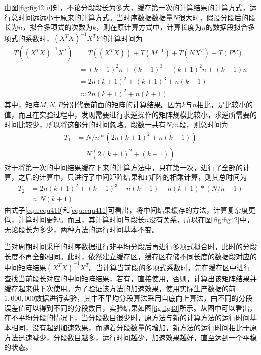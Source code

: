由图\ref{fig:fig42}可知，不论分段段长为多大，缓存第一次的计算结果的计算方式，运行总时间远远小于原来的计算方式。当时序数据数据量$N$很大时，假设分段后的段长为$n$，拟合多项式的次数为$k$，则在原计算方式中，计算长度为$n$的数据段拟合多项式的系数时，$(X^TX)^{-1}X^TY$的计算时间为
\begin{equation}
\begin{split}
T((X^TX)^{-1}X^T) &= T((X^TX)) + T(M^{-1}) + T(NX^T)  + T(PY)\\
                  &= \left ( k+1 \right )^2n + \left ( k+1 \right )^{3} + \left ( k+1 \right )^2n+\left ( k+1 \right )n \\
                  &= 2n(k+1)^2 + (k+1) ^3 + n(k+1) \\
                  &\approx 2n(k+1)^2 + n(k+1)
\end{split}
\end{equation}
其中，矩阵$M, N, P$分别代表前面的矩阵的计算结果。因为$k$与$n$相比，是比较小的值，而且在实验过程中，发现需要进行求逆操作的矩阵规模比较小，求逆所需要的时间比较少，所以将这部分的时间忽略。段数一共有$N/n$段，则总时间为
\begin{equation} \label{equ:equ410}
\begin{split}
T_1 &= N/n * (2n(k+1)^2 + n(k+1)) \\
 &= N(2(k+1)^2 + (k+1))
\end{split}
\end{equation}
对于将第一次的中间结果缓存下来的计算方法中，只在第一次，进行了全部的计算，之后的计算中，只进行了中间矩阵结果和$Y$矩阵的相乘计算，则其总时间为
\begin{equation}\label{equ:equ411}
\begin{split}
T_2 &= 2n(k+1)^2 + (k+1) ^3 + n(k+1) + n(k+1)*(N/n-1) \\
&\approx N(k+1)
\end{split}
\end{equation}
由式子\ref{equ:equ410}和\ref{equ:equ411}可看出，将中间结果缓存的方法，计算复杂度更低，计算时间更短。而且，其计算时间与段长$n$没有关系，所以在图\ref{fig:fig42}中，无论段长为多少，两种方法的运行时间基本不变。

当对周期时间采样的时序数据进行非平均分段后再进行多项式拟合时，此时的分段长度不再全部相同。此时，依然建立缓存区，缓存区存储不同长度的数据段对应的中间矩阵结果$(X^TX)^{-1}X^T$。当计算当前段的多项式系数时，先在缓存区中进行查找当前段长对应的中间矩阵结果，若有，直接使用，否则，计算出该矩阵结果并缓存起来供下次使用。为了验证该方法的加速效果，使用实际生产数据的前$1,000,000$数据进行实验，其中不平均分段算法采用自底向上算法，由不同的分段误差值可以得到不同的分段数目，实验结果如图\ref{fig:fig43}所示。从图中可以看出，在不平均分段的情况下，当分段数目很少时，原方法与新的计算方法的运行时间基本相同，没有起到加速效果，而随着分段数量的增加，新方法的运行时间相比于原方法迅速减少，分段数目越多，运行时间越少，加速效果越好，直至达到一个平稳的状态。

